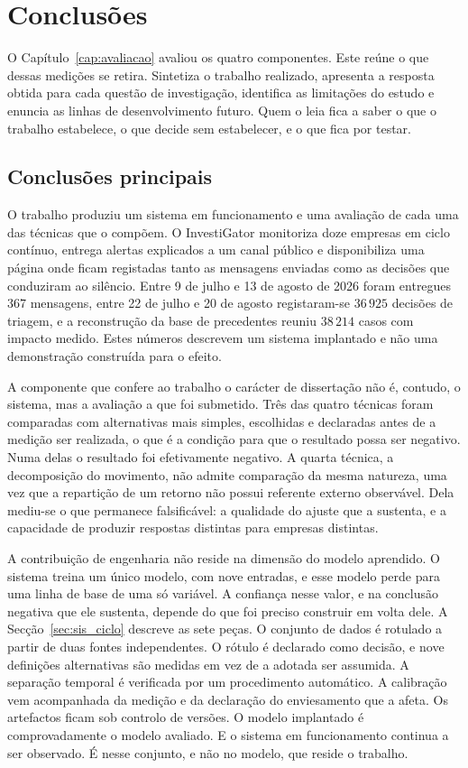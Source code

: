 \chapter{Conclusões}
\label{cap:conclusoes}

O Capítulo~\ref{cap:avaliacao} avaliou os quatro componentes. Este reúne o que dessas
medições se retira. Sintetiza o trabalho realizado, apresenta a resposta obtida para cada questão de
investigação, identifica as limitações do estudo e enuncia as linhas de desenvolvimento futuro. Quem o leia fica a saber o que o trabalho estabelece, o que decide sem estabelecer, e o que fica por testar.

\section{Conclusões principais}
\label{sec:con_principais}

O trabalho produziu um sistema em funcionamento e uma avaliação de cada uma das técnicas que o
compõem. O InvestiGator monitoriza doze empresas em ciclo contínuo, entrega alertas explicados a um
canal público e disponibiliza uma página onde ficam registadas tanto as mensagens enviadas como as
decisões que conduziram ao silêncio. Entre 9 de julho e 13 de agosto de 2026 foram entregues
$367$ mensagens, entre 22 de julho e 20 de agosto registaram-se $36\,925$ decisões de triagem,
e a reconstrução da base de precedentes reuniu $38\,214$ casos com impacto medido. Estes números
descrevem um sistema implantado e não uma demonstração construída para o efeito.

A componente que confere ao trabalho o carácter de dissertação não é, contudo, o sistema, mas a
avaliação a que foi submetido. Três das quatro técnicas foram comparadas com alternativas mais
simples, escolhidas e declaradas antes de a medição ser realizada, o que é a condição para que o
resultado possa ser negativo. Numa delas o resultado foi efetivamente negativo. A quarta técnica, a decomposição do movimento, não admite comparação da mesma natureza, uma vez
que a repartição de um retorno não possui referente externo observável. Dela mediu-se o que
permanece falsificável: a qualidade do ajuste que a sustenta, e a capacidade de produzir respostas
distintas para empresas distintas.

A contribuição de engenharia não reside na dimensão do modelo aprendido. O sistema treina um único
modelo, com nove entradas, e esse modelo perde para uma linha de base de uma só variável. A confiança nesse valor, e na conclusão negativa que ele sustenta, depende do que foi preciso
construir em volta dele. A Secção~\ref{sec:sis_ciclo} descreve as sete peças. O conjunto de dados
é rotulado a partir de duas fontes independentes. O rótulo é declarado como decisão, e nove
definições alternativas são medidas em vez de a adotada ser assumida. A separação temporal é verificada por um
procedimento automático. A calibração vem acompanhada da medição e da declaração do enviesamento
que a afeta. Os artefactos ficam sob controlo de versões. O modelo implantado é comprovadamente o
modelo avaliado. E o sistema em funcionamento continua a ser observado. É nesse conjunto, e não no
modelo, que reside o trabalho.

